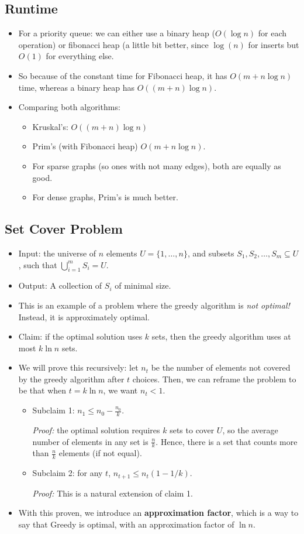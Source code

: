 	\subsection{Runtime}
	\begin{itemize}
		\item For a priority queue: we can either use a binary heap ($O(\log n)$ for each operation) or 
			fibonacci heap (a little bit better, since $\log(n)$ for inserts but $O(1)$ for everything else. 
		\item So because of the constant time for Fibonacci heap, it has $O(m + n \log n)$ time, whereas
			a binary heap has $O((m + n) \log n)$.
		\item Comparing both algorithms:
			\begin{itemize}
				\item Kruskal's: $O((m + n) \log n)$
				\item Prim's (with Fibonacci heap) $O(m + n \log n)$.
				\item For sparse graphs (so ones with not many edges), both are equally as good.
				\item For dense graphs, Prim's is much better. 
			\end{itemize}
	\end{itemize}
	\subsection{Set Cover Problem}
	\begin{itemize}
		\item Input: the universe of $n$ elements $U = \{1, \dots, n\}$, and subsets 
			$S_1, S_2, \dots, S_m \subseteq U$, such that $\bigcup_{i = 1}^m S_i = U$. 
		\item Output: A collection of $S_i$ of minimal size.
		\item This is an example of a problem where the greedy algorithm is \textit{not optimal!} Instead, 
			it is approximately optimal. 
		\item Claim: if the optimal solution uses $k$ sets, then the greedy algorithm uses 
			at most $k \ln n$ sets. 
		\item We will prove this recursively: let $n_t$ be the number of elements not covered by the greedy 
			algorithm after $t$ choices. Then, we can reframe the problem to be that 
			when $t = k \ln n$, we want $n_t < 1$. 
			\begin{itemize}
				\item Subclaim 1: $n_1 \le n_0 - \frac{n_0}{k}$. 

					\textit{Proof:} the optimal solution requires $k$ sets to cover $U$, so the 
					average number of elements in any set is $\frac{n}{k}$. Hence, there is a set 
					that counts more than $\frac{n}{k}$ elements (if not equal).
				\item Subclaim 2: for any $t$, $n_{t+1} \le n_t(1 - 1 / k)$.
					
					\textit{Proof:} This is a natural extension of claim 1.  
			\end{itemize}
		\item With this proven, we introduce an \textbf{approximation factor}, which is a way to say that Greedy
			is optimal, with an approximation factor of $\ln n$. 
	\end{itemize}

